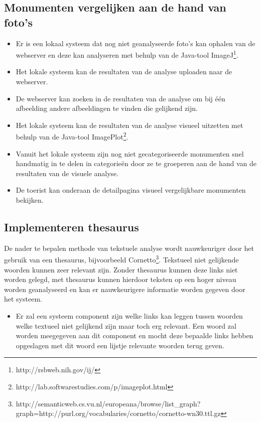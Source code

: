 \documentclass[a4paper,10pt]{article}
\begin{document}
            \subsection{Monumenten vergelijken aan de hand van foto's}
	  \begin{itemize}
		\item Er is een lokaal systeem dat nog niet geanalyseerde foto's kan ophalen van de webserver en deze kan analyseren met behulp van de Java-tool ImageJ\footnote{http://rsbweb.nih.gov/ij/}.
		\item Het lokale systeem kan de resultaten van de analyse uploaden naar de webserver.
		\item De webserver kan zoeken in de resultaten van de analyse om bij \'e\'en afbeelding andere afbeeldingen te vinden die gelijkend zijn.
		\item Het lokale systeem kan de resultaten van de analyse visueel uitzetten met behulp van de Java-tool  ImagePlot\footnote{http://lab.softwarestudies.com/p/imageplot.html}.
		\item Vanuit het lokale systeem zijn nog niet gecategoriseerde monumenten snel handmatig in te delen in categorie\"en door ze te groeperen aan de hand van de resultaten van de visuele analyse.
		\item De toerist kan onderaan de detailpagina visueel vergelijkbare monumenten bekijken.
	  \end{itemize}
	                
            \subsection{Implementeren thesaurus}
            De nader te bepalen methode van tekstuele analyse wordt nauwkeuriger door het gebruik van een thesaurus, bijvoorbeeld Cornetto\footnote{http://semanticweb.cs.vu.nl/europeana/browse/list\_graph?graph=http://purl.org/vocabularies/cornetto/cornetto-wn30.ttl.gz}. Tekstueel niet gelijkende woorden kunnen zeer relevant zijn. Zonder thesaurus kunnen deze links niet worden gelegd, met thesaurus kunnen hierdoor teksten op een hoger niveau worden geanalyseerd en kan er nauwkeurigere informatie worden gegeven door het systeem.
\begin{itemize}
\item Er zal een systeem component zijn welke links kan leggen tussen woorden welke textueel niet gelijkend zijn maar toch erg relevant. Een woord zal worden meegegeven aan dit component en mocht deze bepaalde links hebben opgeslagen met dit woord een lijstje relevante woorden terug geven.
\end{itemize}
        
\end{document}
